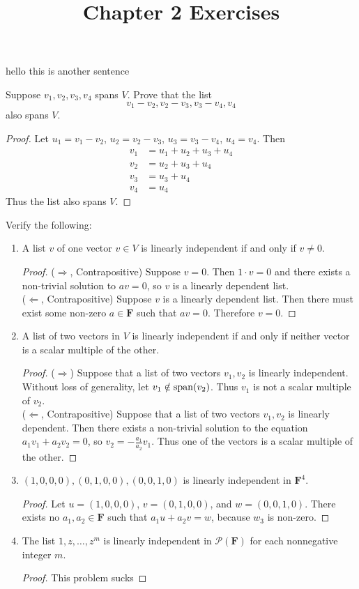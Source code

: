 \documentclass{article}
\title{Chapter 2 Exercises}
\begin{document}
  hello this is another sentence 
  \maketitle
  \newpage
  \noindent
  \renewcommand{\chapternum}{2.A}
   Suppose $v_1, v_2, v_3, v_4$ spans $V$. Prove that the list
  \[
    v_1 - v_2, v_2 - v_3, v_3 - v_4, v_4
  \]
  also spans $V$.
  \begin{proof}
    Let $u_1 = v_1 - v_2$, $u_2 = v_2 - v_3$, $u_3 = v_3 - v_4$, $u_4 = v_4$. Then
    \begin{align*}
      v_1 &= u_1 + u_2 + u_3 + u_4 \\
      v_2 &= u_2 + u_3 + u_4 \\
      v_3 &= u_3 + u_4 \\
      v_4 &= u_4
    \end{align*}
    Thus the list also spans $V$.
  \end{proof}
   Verify the following:
  \begin{enumerate}[label=(\alph*)]
    \item A list $v$ of one vector $v \in V$ is linearly independent if and only if $v \neq 0$.
      \begin{proof}
        ($\Rightarrow$, Contrapositive) Suppose $v = 0$. Then $1\cdot v = 0$ and there exists a non-trivial solution to $av = 0$, so $v$ is a linearly dependent list. \\
        ($\Leftarrow$, Contrapositive) Suppose $v$ is a linearly dependent list. Then there must exist some non-zero $a \in \mathbf F$ such that $av = 0$. Therefore $v = 0$.
      \end{proof}
    \item A list of two vectors in $V$ is linearly independent if and only if neither vector is a scalar multiple of the other.
      \begin{proof}
        ($\Rightarrow$) Suppose that a list of two vectors $v_1, v_2$ is linearly independent. Without loss of generality, let $v_1 \notin \operatorname{span}(v_2)$. Thus $v_1$ is not a scalar multiple of $v_2$. \\
        ($\Leftarrow$, Contrapositive) Suppose that a list of two vectors $v_1, v_2$ is linearly dependent. Then there exists a non-trivial solution to the equation $a_1v_1 + a_2v_2 = 0$, so $v_2 = -\frac{a_1}{a_2}v_1$. Thus one of the vectors is a scalar multiple of the other.
      \end{proof}
    \item $(1, 0, 0, 0), (0, 1, 0, 0), (0, 0, 1, 0)$ is linearly independent in $\mathbf F^4$.
      \begin{proof}
        Let $u = (1, 0, 0, 0)$, $v = (0, 1, 0, 0)$, and $w = (0, 0, 1, 0)$. There exists no $a_1, a_2 \in \mathbf F$ such that $a_1u + a_2v = w$, because $w_3$ is non-zero.
      \end{proof}
    \item The list $1, z, \dotsc, z^m$ is linearly independent in $\mathcal P(\mathbf F)$ for each nonnegative integer $m$.
      \begin{proof}
        This problem sucks
      \end{proof}
  \end{enumerate}
\end{document}
